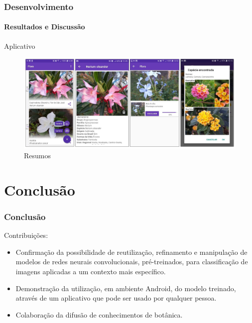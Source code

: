 \documentclass{beamer}
\begin{document}
	\begin{frame}[t]
    		\frametitle{Desenvolvimento}
    		\framesubtitle{Resultados e Discussão}		
		Aplicativo
		\begin{figure}[hbt]
      	 		\begin{center}
      			\includegraphics[height=.45 \textwidth]{img/print1.png}
      			\end{center}
      			\caption{Resumos~\cite{computer-1209641}}
      			\end{figure}	
    \end{frame}  
    
    \section{Conclusão}
      \begin{frame}[t]
      \frametitle{Conclusão}
      Contribuições:
      \begin{itemize}
      	\item<1-> Confirmação da possibilidade de reutilização, refinamento e manipulação de modelos de redes neurais convolucionais, pré-treinados, para classificação de imagens aplicadas a um contexto mais específico.
		\item<2-> Demonstração da utilização, em ambiente Android, do modelo treinado, através de um aplicativo que pode ser usado por qualquer pessoa.
		\item<3-> Colaboração da difusão de conhecimentos de botânica.
      \end{itemize}       
        
    \end{frame}
    
\end{document}
